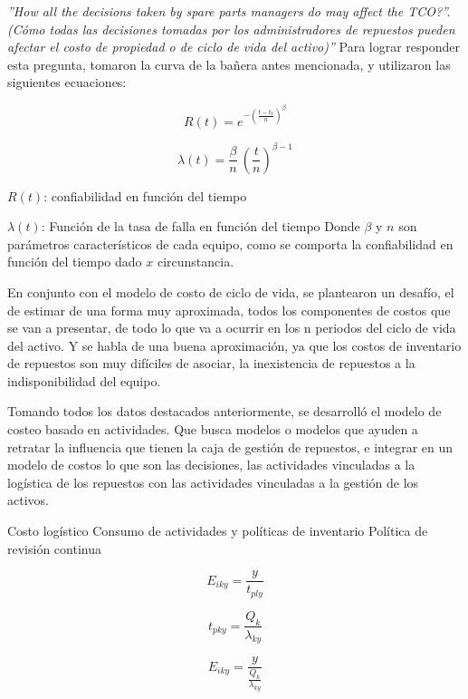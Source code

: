 \documentclass[]{article}
\begin{document}
\textsl{''How all the decisions taken by spare parts managers do may affect the TCO?”. (Cómo todas las decisiones tomadas por los administradores de repuestos pueden afectar el costo de propiedad o de ciclo de vida del activo)''}
Para lograr responder esta pregunta, tomaron la curva de la bañera antes mencionada, y utilizaron las siguientes ecuaciones:

\begin{equation}
    R(t) = e^{{-(\frac{t-t_0}{n})}^{\beta}}
\end{equation}

\begin{equation}
    \lambda(t) = \frac{\beta}{n} \ \! (\frac{t}{n})^{\beta - 1} 
\end{equation}

$R(t)$: confiabilidad en función del tiempo

$\lambda(t)$: Función de la tasa de falla en función del tiempo
Donde $\beta$ y $n$ son parámetros característicos de cada equipo, como se comporta la confiabilidad en función del tiempo dado $x$ circunstancia.

En conjunto con el modelo de costo de ciclo de vida, se plantearon un desafío, el de estimar de una forma muy aproximada, todos los componentes de costos que se van a presentar, de todo lo que va a ocurrir en los n periodos del ciclo de vida del activo. Y se habla de una buena aproximación, ya que los costos de inventario de repuestos son muy difíciles de asociar, la inexistencia de repuestos a la indisponibilidad del equipo. 

Tomando todos los datos destacados anteriormente, se desarrolló el modelo de costeo basado en actividades. Que busca modelos o modelos que ayuden a retratar la influencia que tienen la caja de gestión de repuestos, e integrar en un modelo de costos lo que son las decisiones, las actividades vinculadas a la logística de los repuestos con las actividades vinculadas a la gestión de los activos. 

Costo logístico 
Consumo de actividades y políticas de inventario
Política de revisión continua 


\begin{equation}
    E_{iky} = \frac{y}{t_{ply}}
\end{equation}

\begin{equation}
    t_{pky} = \frac{Q_k}{\lambda_{ky}}
\end{equation}

\begin{equation}
     E_{iky} = \frac{y}{\frac{Q_k}{\lambda_{ky}}}
\end{equation}
\end{document}
